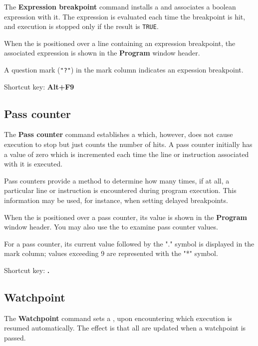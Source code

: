 The {\bf Expression breakpoint} command installs a
and associates a boolean expression with it. The expression is evaluated each
time the breakpoint is hit, and execution is stopped only if the result is
\verb'TRUE'.

When the 
is positioned over a line containing an expression
breakpoint, the associated expression is shown in the {\bf Program}
window header.

A question mark (\verb'"?"') in the mark column indicates an expession
breakpoint.

Shortcut key: {\bf Alt+F9}

\subsection{Pass counter}
\label{dialog:breaks:counter}

The {\bf Pass counter} command establishes a
which, however, does not cause execution to stop but just counts the number of hits.
A pass counter initially has a value of zero which is incremented
each time the line or instruction associated with it is
executed.

Pass counters provide a method to determine how many times,
if at all, a particular line or instruction is encountered during
program execution.
This information may be used, for instance, when setting delayed
breakpoints.

When the  is positioned over
a pass counter, its value is shown in the {\bf Program} window header.
You may also use the 
to examine pass counter values.

For a pass counter, its current value followed by the "." symbol
is displayed in the mark column; values exceeding 9 are represented
with the "*" symbol.

Shortcut key: {\bf .}

\subsection{Watchpoint}
\label{dialog:breaks:watchpoint}

The {\bf Watchpoint} command sets a
,
upon encountering which execution is resumed automatically.
The effect is that all 
are updated when a watchpoint is passed.

